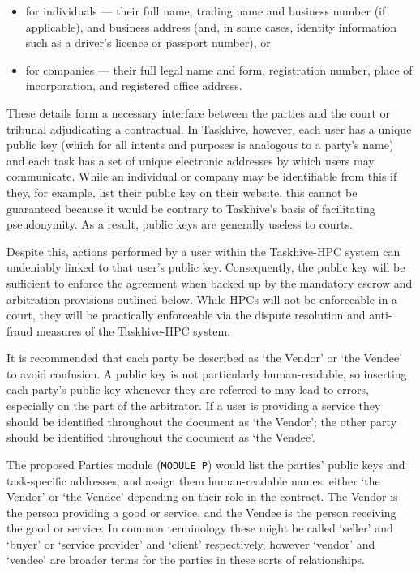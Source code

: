 \documentclass[a4paper,12pt]{article}
\begin{document}
\begin{itemize}
	\item for individuals --- their full name, trading name and business number (if applicable), and business address (and, in some cases, identity information such as a driver's licence or passport number), or
	\item for companies --- their full legal name and form, registration number, place of incorporation, and registered office address.
\end{itemize}

These details form a necessary interface between the parties and the court or tribunal adjudicating a contractual. In Taskhive, however, each user has a unique public key (which for all intents and purposes is analogous to a party's name) and each task has a set of unique electronic addresses by which users may communicate. While an individual or company may be identifiable from this if they, for example, list their public key on their website, this cannot be guaranteed because it would be contrary to Taskhive's basis of facilitating pseudonymity. As a result, public keys are generally useless to courts.

Despite this, actions performed by a user within the Taskhive-HPC system can undeniably linked to that user's public key. Consequently, the public key will be sufficient to enforce the agreement when backed up by the mandatory escrow and arbitration provisions outlined below. While HPCs will not be enforceable in a court, they will be practically enforceable via the dispute resolution and anti-fraud measures of the Taskhive-HPC system.

It is recommended that each party be described as `the Vendor' or `the Vendee' to avoid confusion. A public key is not particularly human-readable, so inserting each party's public key whenever they are referred to may lead to errors, especially on the part of the arbitrator. If a user is providing a service they should be identified throughout the document as `the Vendor'; the other party should be identified throughout the document as `the Vendee'.

The proposed Parties module (\texttt{MODULE P}) would list the parties' public keys and task-specific addresses, and assign them human-readable names: either `the Vendor' or `the Vendee' depending on their role in the contract. The Vendor is the person providing a good or service, and the Vendee is the person receiving the good or service. In common terminology these might be called `seller' and `buyer' or `service provider' and `client' respectively, however `vendor' and `vendee' are broader terms for the parties in these sorts of relationships.
\end{document}
